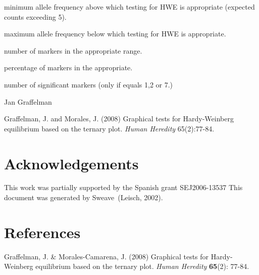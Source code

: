 \documentclass[a4paper]{article}
\begin{document}
\begin{Value}
\begin{ldescription}
\item[\code{minp }] minimum allele frequency above which testing for HWE is appropriate (expected counts exceeding 5).
\item[\code{maxp }] maximum allele frequency below which testing for HWE is appropriate.
\item[\code{inrange }] number of markers in the appropriate range.
\item[\code{percinrange }] percentage of markers in the appropriate.
\item[\code{nsignif }] number of significant markers (only if  equals 1,2 or 7.)
\end{ldescription}
\end{Value}
\begin{Author}\relax
Jan Graffelman 
\end{Author}
\begin{References}\relax
Graffelman, J. and Morales, J. (2008) Graphical tests for Hardy-Weinberg equilibrium 
based on the ternary plot. \emph{Human Heredity} 65(2):77-84.
\end{References}
\begin{SeeAlso}\relax
{}
\end{SeeAlso}
\begin{Examples}
\end{Examples}


\section*{Acknowledgements}

This work was partially supported by the Spanish grant SEJ2006-13537 This document was generated by 
Sweave~(Leisch, 2002).

\section{References}

Graffelman, J. \& Morales-Camarena, J. (2008) Graphical tests for Hardy-Weinberg equilibrium
based on the ternary plot. {\it Human Heredity} {\bf 65}(2): 77-84.\\
\end{document}
